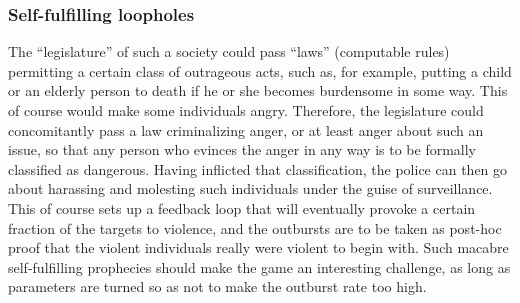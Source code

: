 \subsubsection{Self-fulfilling loopholes}

The ``legislature'' of such a society could pass ``laws'' (computable rules)
permitting a certain class of outrageous acts, such as, for example, putting
a child or an elderly person to death if he or she becomes burdensome in
some way.
This of course would make some individuals angry.
Therefore, the legislature could concomitantly pass a law criminalizing anger,
or at least anger about such an issue, so that any person who evinces the
anger in any way is to be formally classified as dangerous.
Having inflicted that classification, the police can then go about
harassing and molesting such individuals under the guise of
surveillance.
This of course sets up a feedback loop that will eventually provoke a certain
fraction of the targets to violence, and the outbursts are to be taken as
post-hoc proof that the violent individuals really were violent to begin with.
Such macabre self-fulfilling prophecies should make the game an interesting
challenge, as long as parameters are turned so as not to make the outburst
rate too high.
